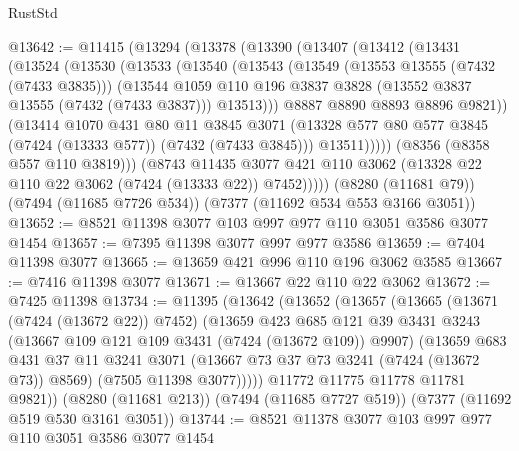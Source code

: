 \begin{lexlean}{RustStd}
\begin{coremodule}
@13642 := @11415
    (@13294
      (@13378
        (@13390
          (@13407
            (@13412
              (@13431
                (@13524
                  (@13530
                    (@13533
                      (@13540
                        (@13543
                          (@13549
                            (@13553 @13555 (@7432 (@7433 @3835)))
                            (@13544
                              @1059
                              @110
                              @196
                              @3837
                              @3828
                              (@13552 @3837 @13555 (@7432 (@7433 @3837)))
                              @13513)))
                        @8887
                        @8890
                        @8893
                        @8896
                        @9821))
                    (@13414
                      @1070
                      @431
                      @80
                      @11
                      @3845
                      @3071
                      (@13328 @577 @80 @577 @3845 (@7424 (@13333 @577)) (@7432 (@7433 @3845)))
                      @13511)))))
            (@8356 (@8358 @557 @110 @3819)))
          (@8743
            @11435
            @3077
            @421
            @110
            @3062
            (@13328 @22 @110 @22 @3062 (@7424 (@13333 @22)) @7452)))))
    (@8280 (@11681 @79))
    (@7494 (@11685 @7726 @534))
    (@7377 (@11692 @534 @553 @3166 @3051))
@13652 := @8521 @11398 @3077 @103 @997 @977 @110 @3051 @3586 @3077 @1454
@13657 := @7395 @11398 @3077 @997 @977 @3586
@13659 := @7404 @11398 @3077
@13665 := @13659 @421 @996 @110 @196 @3062 @3585
@13667 := @7416 @11398 @3077
@13671 := @13667 @22 @110 @22 @3062
@13672 := @7425 @11398
@13734 := @11395
    (@13642
      (@13652
        (@13657
          (@13665
            (@13671 (@7424 (@13672 @22)) @7452)
            (@13659
              @423
              @685
              @121
              @39
              @3431
              @3243
              (@13667 @109 @121 @109 @3431 (@7424 (@13672 @109)) @9907)
              (@13659
                @683
                @431
                @37
                @11
                @3241
                @3071
                (@13667 @73 @37 @73 @3241 (@7424 (@13672 @73)) @8569)
                (@7505 @11398 @3077)))))
        @11772
        @11775
        @11778
        @11781
        @9821))
    (@8280 (@11681 @213))
    (@7494 (@11685 @7727 @519))
    (@7377 (@11692 @519 @530 @3161 @3051))
@13744 := @8521 @11378 @3077 @103 @997 @977 @110 @3051 @3586 @3077 @1454

\end{coremodule}
\end{lexlean}
